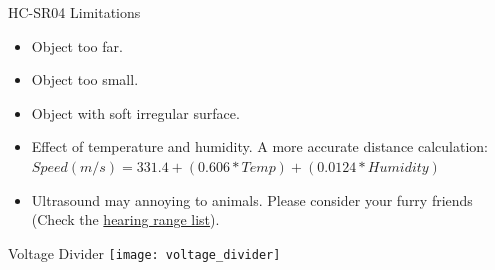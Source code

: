 \documentclass[12pt,letterpaper]{beamer}
\begin{document}
\begin{frame}{HC-SR04 Limitations}

    {\small
        \begin{itemize}
            \item Object too far.
            \item Object too small.
            \item Object with soft irregular surface.
            \item Effect of temperature and humidity. A more accurate distance calculation: $Speed(m/s) = 331.4 + (0.606 * Temp) + (0.0124 * Humidity)$
            \item Ultrasound may annoying to animals. Please consider your furry friends (Check the \href{https://en.wikipedia.org/wiki/Hearing_range}{hearing range list}).
        \end{itemize}
    }
\end{frame}

\begin{frame}{Voltage Divider}
    \texttt{[image: voltage\_divider]}
\end{frame}
\end{document}
